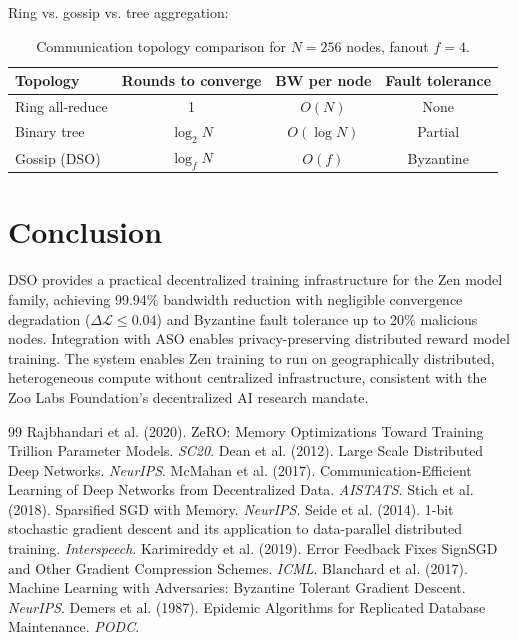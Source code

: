 \documentclass[11pt,a4paper]{article}
\begin{document}
Ring vs. gossip vs. tree aggregation:
\begin{table}[H]
\centering
\begin{tabular}{lccc}
\toprule
\textbf{Topology} & \textbf{Rounds to converge} & \textbf{BW per node} & \textbf{Fault tolerance} \\
\midrule
Ring all-reduce & 1 & $O(N)$ & None \\
Binary tree & $\log_2 N$ & $O(\log N)$ & Partial \\
Gossip (DSO) & $\log_f N$ & $O(f)$ & Byzantine \\
\bottomrule
\end{tabular}
\caption{Communication topology comparison for $N=256$ nodes, fanout $f=4$.}
\end{table}

\section{Conclusion}

DSO provides a practical decentralized training infrastructure for the Zen model family,
achieving 99.94\% bandwidth reduction with negligible convergence degradation ($\Delta\mathcal{L} \le 0.04$)
and Byzantine fault tolerance up to 20\% malicious nodes. Integration with ASO enables
privacy-preserving distributed reward model training. The system enables Zen training
to run on geographically distributed, heterogeneous compute without centralized
infrastructure, consistent with the Zoo Labs Foundation's decentralized AI research mandate.


\begin{thebibliography}{99}
 Rajbhandari et al. (2020). ZeRO: Memory Optimizations Toward Training Trillion Parameter Models. \textit{SC20}.
 Dean et al. (2012). Large Scale Distributed Deep Networks. \textit{NeurIPS}.
 McMahan et al. (2017). Communication-Efficient Learning of Deep Networks from Decentralized Data. \textit{AISTATS}.
 Stich et al. (2018). Sparsified SGD with Memory. \textit{NeurIPS}.
 Seide et al. (2014). 1-bit stochastic gradient descent and its application to data-parallel distributed training. \textit{Interspeech}.
 Karimireddy et al. (2019). Error Feedback Fixes SignSGD and Other Gradient Compression Schemes. \textit{ICML}.
 Blanchard et al. (2017). Machine Learning with Adversaries: Byzantine Tolerant Gradient Descent. \textit{NeurIPS}.
 Demers et al. (1987). Epidemic Algorithms for Replicated Database Maintenance. \textit{PODC}.
\end{thebibliography}
\end{document}
